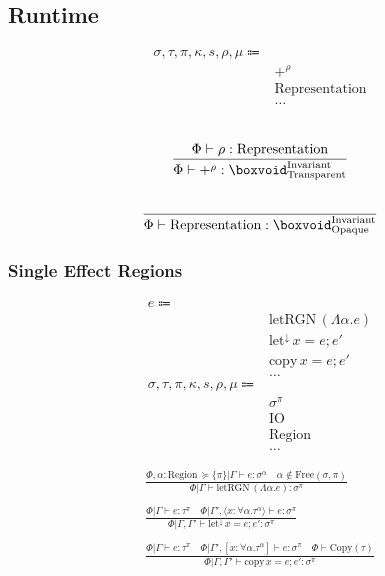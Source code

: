 \documentclass {article}
\begin{document}
\subsection{Runtime}

\begin{align*}
\sigma, \tau, \pi, \kappa, s, \rho, \mu \Coloneqq & \\
& +^\rho \tag{Pretype}\\
& \text{Representation} \tag {Representation}\\
& \dots
\end{align*}

\begin{gather*}
\\
\frac
{\Phi \vdash \rho : \text{Representation}}
{\Phi \vdash +^\rho : \boxvoid^\text{Invariant}_\text{Transparent}} \\
\\
\frac
{}
{\Phi \vdash \text{Representation} : \boxvoid^\text{Invariant}_\text{Opaque}}
\end{gather*}

\subsubsection{Single Effect Regions}
\begin{align*}
e \Coloneqq & \\
& \text{letRGN} \, (\Lambda \alpha. e) \tag{Create Region} \\
& \text{let}^\downarrow \, x = e; e' \tag{Runtime Let} \\
& \text{copy} \, x = e; e' \tag{Runtime Copy Let} \\
& \dots \\
\sigma, \tau, \pi, \kappa, s, \rho, \mu \Coloneqq & \\
& \sigma^\pi \tag{Region Effect} \\
& \text{IO} \tag{IO Region} \\
& \text{Region} \tag{Region} \\
& \dots
\end{align*}

\begin{gather*}
\frac
{\Phi , \alpha : \text{Region} \, \succeq \{ \pi \} | \Gamma \vdash e : \sigma^\alpha \quad \alpha \notin \text{Free}(\sigma, \pi)}
{\Phi | \Gamma \vdash \text{letRGN} \, (\Lambda \alpha. e) : \sigma^\pi} \\
\\
\frac
{\Phi | \Gamma \vdash e : \tau^\pi \quad \Phi | \Gamma', \langle x : \forall \alpha. \tau^\alpha \rangle \vdash e : \sigma^\pi}
{\Phi | \Gamma, \Gamma' \vdash \text{let}^\downarrow \, x = e; e' : \sigma^\pi} \\
\\
\frac
{\Phi | \Gamma \vdash e : \tau^\pi \quad \Phi | \Gamma', [ x : \forall \alpha. \tau^\alpha ] \vdash e : \sigma^\pi \quad \Phi \vdash \text{Copy}(\tau)}
{\Phi | \Gamma, \Gamma' \vdash \text{copy} \, x = e; e' : \sigma^\pi} \\
\end{gather*}
\end{document}
